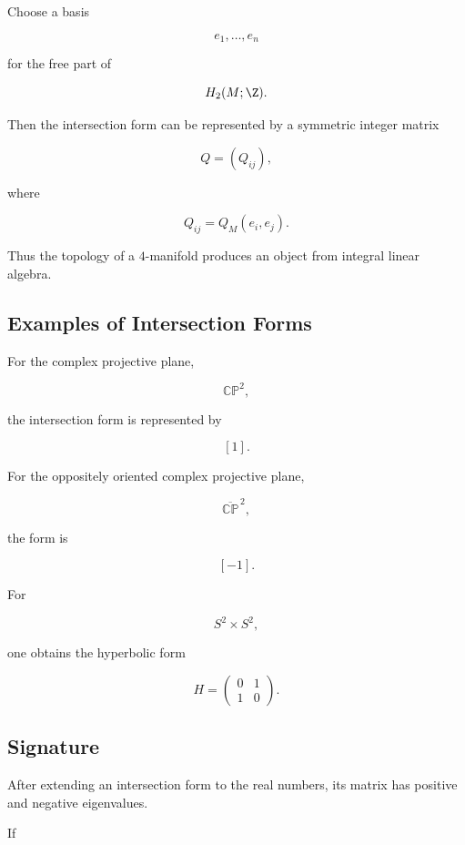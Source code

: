 Choose a basis

\[
e_1,\ldots,e_n
\]

for the free part of

\[
H_2(M;\Z).
\]

Then the intersection form can be represented by a symmetric integer matrix

\[
\boxed{
Q=(Q_{ij}),
}
\]

where

\[
Q_{ij}
=
Q_M(e_i,e_j).
\]

Thus the topology of a \(4\)-manifold produces an object from integral
linear algebra.

\subsection{Examples of Intersection Forms}
\label{subsec:examples-intersection-forms}

For the complex projective plane,

\[
\mathbb{CP}^2,
\]

the intersection form is represented by

\[
\boxed{
[1].
}
\]

For the oppositely oriented complex projective plane,

\[
\overline{\mathbb{CP}}^{\,2},
\]

the form is

\[
\boxed{
[-1].
}
\]

For

\[
S^2\times S^2,
\]

one obtains the hyperbolic form

\[
\boxed{
H
=
\begin{pmatrix}
0&1\\
1&0
\end{pmatrix}.
}
\]

\subsection{Signature}
\label{subsec:four-manifold-signature}

After extending an intersection form to the real numbers, its matrix has
positive and negative eigenvalues.

If

